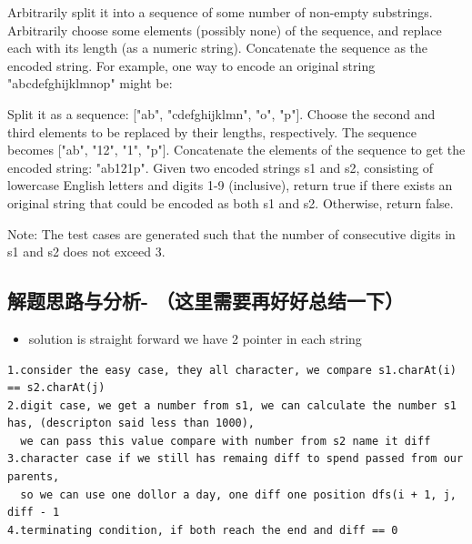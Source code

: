 \documentclass[9pt, b5paaper]{book}
\begin{document}
Arbitrarily split it into a sequence of some number of non-empty substrings.
Arbitrarily choose some elements (possibly none) of the sequence, and replace each with its length (as a numeric string).
Concatenate the sequence as the encoded string.
For example, one way to encode an original string "abcdefghijklmnop" might be:

Split it as a sequence: ["ab", "cdefghijklmn", "o", "p"].
Choose the second and third elements to be replaced by their lengths, respectively. The sequence becomes ["ab", "12", "1", "p"].
Concatenate the elements of the sequence to get the encoded string: "ab121p".
Given two encoded strings s1 and s2, consisting of lowercase English letters and digits 1-9 (inclusive), return true if there exists an original string that could be encoded as both s1 and s2. Otherwise, return false.

Note: The test cases are generated such that the number of consecutive digits in s1 and s2 does not exceed 3.
\subsection{解题思路与分析- （这里需要再好好总结一下）}
\label{sec-15-4-1}
\begin{itemize}
\item solution is straight forward we have 2 pointer in each string
\end{itemize}
\begin{verbatim}
1.consider the easy case, they all character, we compare s1.charAt(i) == s2.charAt(j)
2.digit case, we get a number from s1, we can calculate the number s1 has, (descripton said less than 1000), 
  we can pass this value compare with number from s2 name it diff
3.character case if we still has remaing diff to spend passed from our parents, 
  so we can use one dollor a day, one diff one position dfs(i + 1, j, diff - 1
4.terminating condition, if both reach the end and diff == 0
\end{verbatim}
\end{document}
